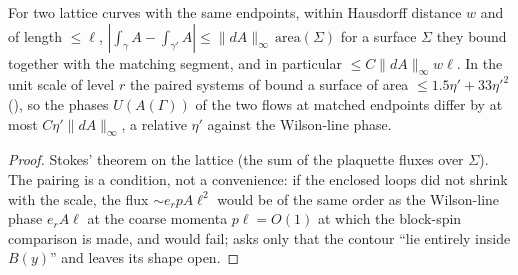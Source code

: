 \begin{lemma}\label{rot:lem:flux}
For two lattice curves with the same endpoints, within Hausdorff distance $w$ and of length $\le\ell$, $|\int_\gamma A-\int_{\gamma'}A|\le\|dA\|_\infty\,\mathrm{area}(\Sigma)$ for a surface $\Sigma$ they bound together with the matching segment, and in particular $\le C\|dA\|_\infty w\ell$. In the unit scale of level $r$ the paired systems of  bound a surface of area $\le1.5\eta'+33\eta'^2$ (), so the phases $U(A(\Gamma))$ of the two flows at matched endpoints differ by at most $C\eta'\|dA\|_\infty$, a relative $\eta'$ against the Wilson-line phase.
\end{lemma}
\begin{proof}
Stokes' theorem on the lattice (the sum of the plaquette fluxes over $\Sigma$). The pairing is a condition, not a convenience: if the enclosed loops did not shrink with the scale, the flux $\sim e_rpA\ell^2$ would be of the same order as the Wilson-line phase $e_rA\ell$ at the coarse momenta $p\ell=O(1)$ at which the block-spin comparison is made, and  would fail; \cite[(4.4)]{K2} asks only that the contour ``lie entirely inside $B(y)$'' and leaves its shape open.
\end{proof}
